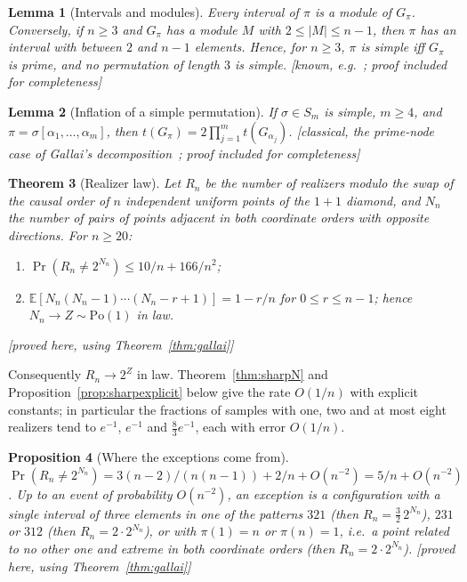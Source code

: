 \documentclass[11pt,a4paper]{article}
\theoremstyle{plain}
\newtheorem{theorem}{Theorem}[section]
\newtheorem{proposition}[theorem]{Proposition}
\newtheorem{lemma}[theorem]{Lemma}
\theoremstyle{definition}
\theoremstyle{remark}
\newcommand{\status}[1]{\textsf{\small [#1]}}
\begin{document}
\begin{lemma}[Intervals and modules]\label{lem:simpleprime}
Every interval of $\pi$ is a module of $G_\pi$. Conversely, if $n\ge3$ and $G_\pi$ has a module $M$ with $2\le|M|\le n-1$, then $\pi$ has an interval with between $2$ and $n-1$ elements. Hence, for $n\ge3$, $\pi$ is simple iff $G_\pi$ is prime, and no permutation of length $3$ is simple. \status{known, e.g.~\citep{brignall2010}; proof included for completeness}
\end{lemma}

\begin{lemma}[Inflation of a simple permutation]\label{lem:inflation}
If $\sigma\in S_m$ is simple, $m\ge4$, and $\pi=\sigma[\alpha_1,\dots,\alpha_m]$, then $t(G_\pi)=2\prod_{j=1}^m t(G_{\alpha_j})$. \status{classical, the prime-node case of Gallai's decomposition~\citep{gallai1967}; proof included for completeness}
\end{lemma}

\begin{theorem}[Realizer law]\label{thm:realizers}
Let $R_n$ be the number of realizers modulo the swap of the causal order of $n$ independent uniform points of the $1{+}1$ diamond, and $N_n$ the number of pairs of points adjacent in both coordinate orders with opposite directions. For $n\ge20$:
\begin{enumerate}[label=(\alph*),leftmargin=2em]
\item $\Pr(R_n\ne2^{N_n})\le 10/n+166/n^2$;
\item $\mathbb E[N_n(N_n-1)\cdots(N_n-r+1)]=1-r/n$ for $0\le r\le n-1$; hence $N_n\to Z\sim\mathrm{Po}(1)$ in law.
\end{enumerate}
\status{proved here, using Theorem~\ref{thm:gallai}}
\end{theorem}

\noindent Consequently $R_n\to2^Z$ in law. Theorem~\ref{thm:sharpN} and Proposition~\ref{prop:sharpexplicit} below give the rate $O(1/n)$ with explicit constants; in particular the fractions of samples with one, two and at most eight realizers tend to $e^{-1}$, $e^{-1}$ and $\tfrac83e^{-1}$, each with error $O(1/n)$.

\begin{proposition}[Where the exceptions come from]\label{prop:exceptions}
$\Pr(R_n\ne2^{N_n})=3(n-2)/(n(n-1))+2/n+O(n^{-2})=5/n+O(n^{-2})$. Up to an event of probability $O(n^{-2})$, an exception is a configuration with a single interval of three elements in one of the patterns $321$ (then $R_n=\tfrac32\,2^{N_n}$), $231$ or $312$ (then $R_n=2\cdot2^{N_n}$), or with $\pi(1)=n$ or $\pi(n)=1$, i.e.\ a point related to no other one and extreme in both coordinate orders (then $R_n=2\cdot2^{N_n}$). \status{proved here, using Theorem~\ref{thm:gallai}}
\end{proposition}
\end{document}
